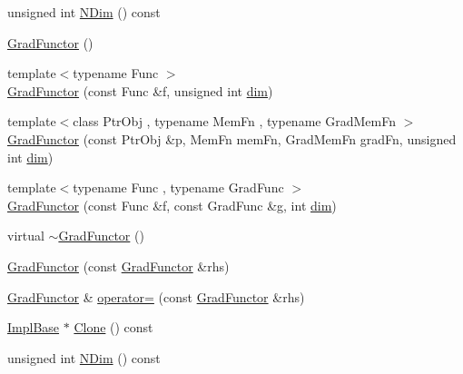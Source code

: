 \begin{DoxyCompactItemize}
unsigned int \mbox{\hyperlink{classROOT_1_1Math_1_1GradFunctor_a7ff4ed4ad6f7c17d74403a443990f069}{N\+Dim}} () const
\item 
\mbox{\hyperlink{classROOT_1_1Math_1_1GradFunctor_a68c75192981688e292ee84be652a8ec4}{Grad\+Functor}} ()
\item 
{\footnotesize template$<$typename Func $>$ }\\\mbox{\hyperlink{classROOT_1_1Math_1_1GradFunctor_a9cdbcd3d49494b4209524b3c5b3172d2}{Grad\+Functor}} (const Func \&f, unsigned int \mbox{\hyperlink{adat__devel_2lib_2hadron_2irrep__util_8cc_a70b5e28b5bc3d1b63a7435c5fe50b837}{dim}})
\item 
{\footnotesize template$<$class Ptr\+Obj , typename Mem\+Fn , typename Grad\+Mem\+Fn $>$ }\\\mbox{\hyperlink{classROOT_1_1Math_1_1GradFunctor_af7c06950b37bea8844b81f53b0bf41df}{Grad\+Functor}} (const Ptr\+Obj \&p, Mem\+Fn mem\+Fn, Grad\+Mem\+Fn grad\+Fn, unsigned int \mbox{\hyperlink{adat__devel_2lib_2hadron_2irrep__util_8cc_a70b5e28b5bc3d1b63a7435c5fe50b837}{dim}})
\item 
{\footnotesize template$<$typename Func , typename Grad\+Func $>$ }\\\mbox{\hyperlink{classROOT_1_1Math_1_1GradFunctor_a079a63821986eb0ce6e011c366c1cb9a}{Grad\+Functor}} (const Func \&f, const Grad\+Func \&g, int \mbox{\hyperlink{adat__devel_2lib_2hadron_2irrep__util_8cc_a70b5e28b5bc3d1b63a7435c5fe50b837}{dim}})
\item 
virtual \mbox{\hyperlink{classROOT_1_1Math_1_1GradFunctor_a1dfc4e8382f679a935eae97c5e7ee4dd}{$\sim$\+Grad\+Functor}} ()
\item 
\mbox{\hyperlink{classROOT_1_1Math_1_1GradFunctor_a629b55d9f326dbf39e5c3ccfb4678579}{Grad\+Functor}} (const \mbox{\hyperlink{classROOT_1_1Math_1_1GradFunctor}{Grad\+Functor}} \&rhs)
\item 
\mbox{\hyperlink{classROOT_1_1Math_1_1GradFunctor}{Grad\+Functor}} \& \mbox{\hyperlink{classROOT_1_1Math_1_1GradFunctor_a7f7a0c6b466d283cb6085f0e57ab1e6a}{operator=}} (const \mbox{\hyperlink{classROOT_1_1Math_1_1GradFunctor}{Grad\+Functor}} \&rhs)
\item 
\mbox{\hyperlink{classROOT_1_1Math_1_1GradFunctor_a1fb9161fc93c7e7fa185dddbcc2c4f4d}{Impl\+Base}} $\ast$ \mbox{\hyperlink{classROOT_1_1Math_1_1GradFunctor_a21093c0d3001069e49ce6278b5a32a40}{Clone}} () const
\item 
unsigned int \mbox{\hyperlink{classROOT_1_1Math_1_1GradFunctor_a7ff4ed4ad6f7c17d74403a443990f069}{N\+Dim}} () const
\item 

\end{DoxyCompactItemize}
